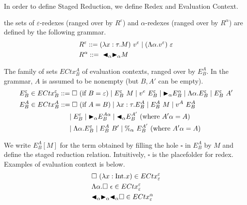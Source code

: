 In order to define Staged Reduction, we define Redex and Evaluation Context.

\begin{definition}[Redex]
	the sets of $\varepsilon$-redexes (ranged over by $R^\varepsilon$) and $\alpha$-redexes (ranged over by $R^\alpha$) are defined by the following grammar.
	\begin{align*}
		 & R^\varepsilon ::= (\lambda x:\tau.M)\ v^\varepsilon \mid (\Lambda\alpha.v^\varepsilon)\ \varepsilon \\
		 & R^\alpha      ::=\ {\mathop{\blacktriangleleft}}_\alpha {\mathop{\blacktriangleright}}_\alpha M                                                         \\
	\end{align*}
\end{definition}

\begin{definition}
	The family of sets $ECtx^A_B$ of evaluation contexts, ranged over by $E^A_B$.
	In the grammar, $A$ is assumed to be nonempty (but $B,A'$ can be empty).
	\begin{align*}
		 & E^\varepsilon_B \in ECtx^\varepsilon_B ::= \square\ (\text{if\ } B = \varepsilon)
		\mid E^\varepsilon_B\ M \mid v^e\ E^\varepsilon_B \mid \TB_\alpha E^\alpha_B
		\mid \Lambda\alpha.E^\varepsilon_B \mid E^\varepsilon_B\ A'                                                                       \\
		 & E^A_B \in ECtx^A_B                     ::= \square\ (\text{if } A = B) \mid \lambda x:\tau.E^A_B \mid E^A_B\ M \mid v^A\ E^A_B \\
		 & \hspace{25mm} \mid E^\varepsilon_B \mid \TB_\alpha E^{A\alpha}_B \mid \TBL_\alpha E^{A'}_B \ (\text{where } A'\alpha = A)      \\
		 & \hspace{25mm} \mid \Lambda\alpha.E^\varepsilon_B \mid E^A_B\ B' \mid \%_\alpha\ E^{A'}_B \ (\text{where } A'\alpha = A)        \\
	\end{align*}
\end{definition}

We write $E^A_B[M]$ for the term obtained by filling the hole $\square$ in $E^A_B$ by $M$ 
and define the staged reduction relation.
Intuitively, $\square$ is the placefolder for redex.
Examples of evaluation context is below.
\begin{align*}
	& \square\ (\lambda x:\textrm{Int}.x) \in  ECtx^\varepsilon_\varepsilon \\
	& \Lambda\alpha.\square\ \epsilon \in ECtx^\varepsilon_\varepsilon \\
	& {\mathop{\blacktriangleleft}}_\alpha {\mathop{\blacktriangleright}}_\alpha {\mathop{\blacktriangleleft}}_\alpha \square \in ECtx^\alpha_\varepsilon 
\end{align*}

